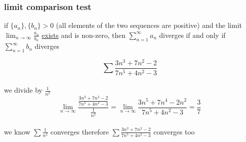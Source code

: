 \documentclass[a4paper,12pt]{article}
\newcommand{\?}{\stackrel{?}{=}}
\begin{document}
\subsubsection{limit comparison test}
\label{sec:org793987b}
\begin{definition}
if \(\{a_n\},\{b_n\} > 0\) (all elements of the two sequences are positive) and the limit \(\lim_{n\to\infty} \frac{a_n}{b_n}\) \hyperref[sec:org0440354]{exists} and is non-zero, then \(\sum_{n=1}^\infty a_n\) diverges if and only if \(\sum_{n=1}^\infty b_n\) diverges\\[0pt]
\begin{my_example}
\[
  \sum \frac{3n^3+7n^2-2}{7n^5+4n^2-3}
\]\\[0pt]
we divide by \(\frac{1}{n^2}\)\\[0pt]
\[
  \lim_{n\to\infty} \frac{\frac{3n^3+7n^2-2}{7n^5+4n^2-3}}{\frac{1}{n^2}} = \lim_{n\to\infty} \frac{3n^5+7n^4-2n^2}{7n^5+4n^2-3} = \frac37
\]\\[0pt]
we know \(\sum \frac{1}{n^2}\) converges therefore \(\sum \frac{3n^3+7n^2-2}{7n^5+4n^2-3}\) converges too\\[0pt]
\end{my_example}
\end{definition}
\end{document}
